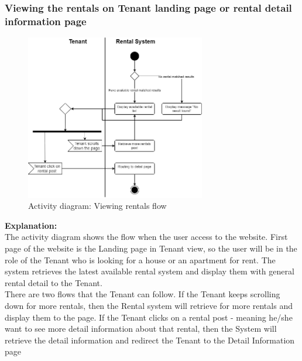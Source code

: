 \subsubsection{Viewing the rentals on Tenant landing page or rental detail information page}
\begin{figure}[H]
    \centering
    \includegraphics[width = 0.7\textwidth]{Images/Activity/ac_diag_view_rental.png}
    \caption{Activity diagram: Viewing rentals flow }
    \label{fig:ac_diag_view_rental}
\end{figure}

\noindent \textbf{Explanation:}\\
The activity diagram shows the flow when the user access to the website. First page of the website is the Landing page in Tenant view, so the user will be in the role of the Tenant who is looking for a house or an apartment for rent. The system retrieves the latest available rental system and display them with general rental detail to the Tenant.\\
There are two flows that the Tenant can follow. If the Tenant keeps scrolling down for more rentals, then the Rental system will retrieve for more rentals and display them to the page. If the Tenant clicks on a rental post - meaning he/she want to see more detail information about that rental, then the System will retrieve the detail information and redirect the Tenant to the Detail Information page


\newpage
